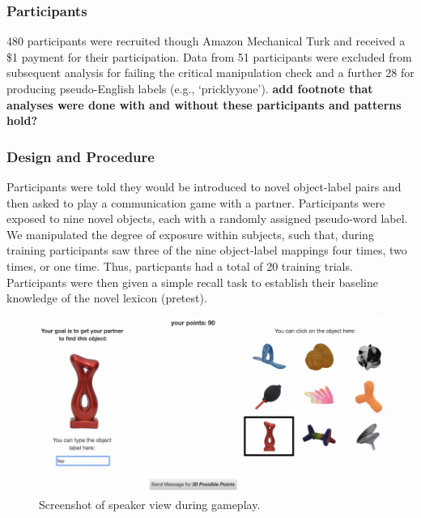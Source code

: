 \documentclass[10pt, letterpaper]{article}
\newenvironment{CodeChunk}{}{}
\begin{document}
\subsubsection{Participants}\label{participants}

480 participants were recruited though Amazon Mechanical Turk and
received a \$1 payment for their participation. Data from 51
participants were excluded from subsequent analysis for failing the
critical manipulation check and a further 28 for producing
pseudo-English labels (e.g., `pricklyyone'). \textbf{add footnote that
analyses were done with and without these participants and patterns
hold?}

\subsubsection{Design and Procedure}\label{design-and-procedure}

Participants were told they would be introduced to novel object-label
pairs and then asked to play a communication game with a partner.
Participants were exposed to nine novel objects, each with a randomly
assigned pseudo-word label. We manipulated the degree of exposure within
subjects, such that, during training participants saw three of the nine
object-label mappings four times, two times, or one time. Thus,
particpants had a total of 20 training trials. Participants were then
given a simple recall task to establish their baseline knowledge of the
novel lexicon (pretest).

\begin{CodeChunk}
\begin{figure}[H]

{\centering \includegraphics{figs/exp_screenshot-1} 

}

\caption[Screenshot of speaker view during gameplay]{Screenshot of speaker view during gameplay.}\label{fig:exp_screenshot}
\end{figure}
\end{CodeChunk}
\end{document}
